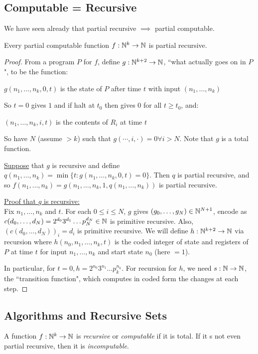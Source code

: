 \documentclass[10pt,a4paper]{article}
\begin{document}
\subsection*{Computable = Recursive}
We have seen already that partial recursive $\implies$ partial computable.
\begin{theorem}
Every partial computable function $f:\mathbb{N}^k \rightarrow \mathbb{N}$ is partial recursive.
\end{theorem}
\begin{proof}
From a program $P$ for $f$, define $g:\mathbb{N}^{k+2}\rightarrow \mathbb{N}$, ``what actually goes on in $P$", to be the function:
\begin{center}
$g(n_1,\ldots,n_k,0,t) $ is the state of $P$ after time $t$ with input $(n_1,\ldots,n_k)$
\end{center}
So $t=0$ gives $1$ and if halt at $t_0$ then gives $0$ for all $t \geq t_0$, and:
\begin{center}
$(n_1, \ldots, n_k, i, t)$ is the contents of $R_i$ at time $t$
\end{center}
So have $N$ (assume $>k$) such that $g(\cdots, i, \cdot) = 0 \forall i>N$. Note that $g$ is a total function.

\underline{Suppose} that $g$ is recursive and define $q(n_1,\ldots, n_k) = \min\{t: g(n_1,\ldots,n_k,0,t)=0\}$. Then $q$ is partial recursive, and so $f(n_1, \ldots, n_k) = g(n_1, \ldots, n_k, 1, q(n_1, \ldots, n_k))$ is partial recursive.

\underline{Proof that $g$ is recursive:}\\
Fix $n_1, \ldots, n_k$ and $t$. For each $0\leq i \leq N$, $g$ gives $(g_0, \ldots, g_N) \in \mathbb{N}^{N+1}$, encode as $c(d_0, \ldots, d_N) = 2^{d_0}3^{d_1}\ldots p_N^{d_N} \in \mathbb{N}$ is primitive recursive. Also, $(c(d_0, \ldots, d_N))_i = d_i$ is primitive recursive. We will define $h:\mathbb{N}^{k+2}\rightarrow \mathbb{N}$ via recursion where $h(n_0, n_1, \ldots, n_k, t)$ is the coded integer of state and registers of $P$ at time $t$ for input $n_1, \ldots, n_k$ and start state $n_0$ (here $=1$).

In particular, for $t=0, h=2^{n_0}3^{n_1}\ldots p_k^{n_k}$. For recursion for $h$, we need $s:\mathbb{N}\rightarrow\mathbb{N}$, the ``transition function", which computes in coded form the changes at each step.
\end{proof}

\subsection*{Algorithms and Recursive Sets}
A function $f:\mathbb{N}^k \rightarrow \mathbb{N}$ is \emph{recursive} or \emph{computable} if it is total. If it s not even partial recursive, then it is \emph{incomputable}.
\end{document}
